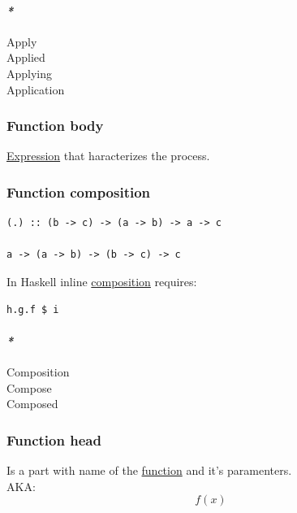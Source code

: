 \documentclass[11pt]{article}
\begin{document}
\paragraph{\emph{*}}
\label{sec:org9813d43}

\label{orgfed746a}Apply\\
\label{org848eb1f}Applied\\
\label{orgc54ef49}Applying\\
\label{orged2f814}Application\\

\subsubsection{\label{orgf284019}Function body}
\label{sec:org2ecdf4c}
\hyperref[org667db83]{Expression} that haracterizes the process.\\

\subsubsection{\label{org57b44d1}Function composition}
\label{sec:org0bd3071}
\begin{verbatim}
(.) :: (b -> c) -> (a -> b) -> a -> c

a -> (a -> b) -> (b -> c) -> c
\end{verbatim}

In Haskell inline \hyperref[org24a8abd]{composition} requires:\\
\begin{verbatim}
h.g.f $ i
\end{verbatim}

\paragraph{\emph{*}}
\label{sec:org7ac11ed}

\label{orgdd874fb}Composition\\
\label{orgb292e6e}Compose\\
\label{orgb941f76}Composed\\

\subsubsection{\label{orgece244c}Function head}
\label{sec:orge7a5a24}
Is a part with name of the \hyperref[orgeb5cddb]{function} and it's paramenters.\\
AKA: $$ f(x) $$\\
\end{document}
